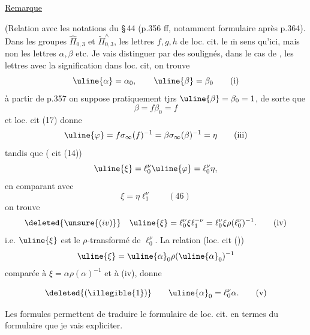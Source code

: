 \uline{Remarque}

(Relation avec les notations du \S\,44 (p.356 ff, notamment formulaire après p.364). Dans les groupes $\widehat{\Pi}_{0,3}$ et $\widetilde{\Pi}_{0,3}^{\wedge}$, les lettres $f,g,h$ de loc. cit.  le $\overline{\mathrm m}$ sens qu'ici, mais non les lettres $\alpha,\beta$ etc. Je vais distinguer par des soulignés, dans le cas de  , les lettres avec la  signification  dans loc. cit, on trouve
\[
\uline{\alpha}=\alpha_0,\qquad\uline{\beta}=\beta_0
\tag{i}
\]
à partir de p.357 on suppose pratiquement tjrs $\uline{\beta}=\beta_0=1$,  de sorte que
\[
\boxed{\beta=f\beta_0=f}
\tag{ii}
\]
 et loc. cit (17) donne
\[
\uline{\varphi}=f\sigma_\infty(f)^{-1}=\beta\sigma_\infty(\beta)^{-1}=\eta
\tag{iii}
\]
tandis que ( cit (14))
\[
\uline{\xi}=\ell_0^\nu\uline{\varphi}=\ell_0^\nu\eta,
\]
en comparant avec
\[
\xi=\eta\ell_1^\nu\qquad(46)
\]
on trouve
\[
\deleted{\unsure{(iv)}}\quad\uline{\xi}=\ell_0^\nu\xi\ell_1^{-\nu}
=\ell_0^\nu\xi\rho(\ell_0^\nu)^{-1}.
\tag{iv}
\]
i.e. $\uline{\xi}$ est le $\rho$-transformé de $\ell_0^\nu$.
La relation (loc. cit ())
\[
\uline{\xi}=\uline{\alpha}_0\rho(\uline{\alpha}_0)^{-1}
\]
comparée à $\xi=\alpha\rho(\alpha)^{-1}$ et à (iv), donne


\[
\deleted{(\illegible{1})}\qquad\uline{\alpha}_0=\ell_0^\nu\alpha.
\tag{v}
\]

Les formules   permettent de traduire le formulaire de loc. cit. en termes du formulaire que je vais expliciter.

